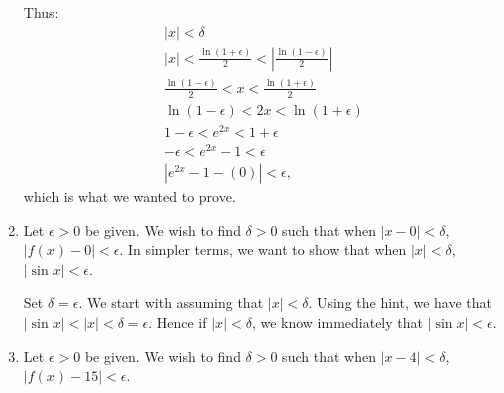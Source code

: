 \begin{enumialphparenastyle}
\begin{ex}
\begin{sol}
\begin{enumerate}
{Thus:
\begin{gather*}
|x| < \delta \\
|x| <\frac{\ln(1+\epsilon)}{2}<\left|\frac{\ln(1-\epsilon)}{2}\right| \\
\frac{\ln(1-\epsilon)}{2} < x < \frac{\ln(1+\epsilon)}{2}\\
\ln(1-\epsilon)< 2x < \ln(1+\epsilon)\\
1-\epsilon < e^{2x} < 1+\epsilon\\
-\epsilon < e^{2x}-1 < \epsilon\\
|e^{2x}-1-(0)| < \epsilon,
\end{gather*}
which is what we wanted to prove.
}
\item 
{Let $\epsilon >0$ be given. We wish to find $\delta >0$ such that when $|x-0|<\delta$, $|f(x)-0|<\epsilon$. In simpler terms, we want to show that when $|x|<\delta$, $|\sin x| < \epsilon$. 

Set $\delta = \epsilon$. We start with assuming that $|x|<\delta$. Using the hint, we have that $|\sin x | < |x| < \delta = \epsilon$. Hence if $|x|<\delta$, we know immediately that $|\sin x| < \epsilon$.
}
\item {Let $\epsilon >0$ be given. We wish to find $\delta >0$ such that when $|x-4|<\delta$, $|f(x)-15|<\epsilon$. 

}
\end{enumerate}
\end{sol}
\end{ex}
\end{enumialphparenastyle}
